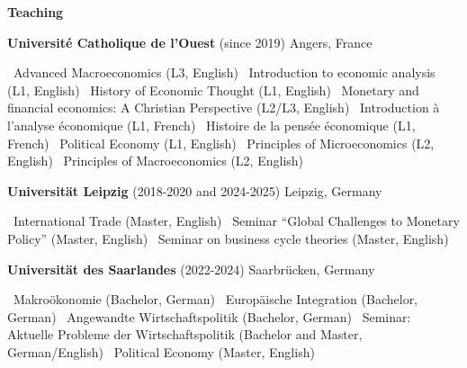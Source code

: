 \documentclass[11pt]{article}
\begin{document}
\vspace{12pt}

\newpage 
\begin{center}
    \textbf{Teaching} \\
\end{center}

\textbf{Université Catholique de l'Ouest} (since 2019) \hfill Angers, France 

\vspace{7pt}

    \textbullet \ Advanced Macroeconomics (L3, English) \textbullet \ Introduction to economic analysis (L1, English)
    \textbullet \ History of Economic Thought (L1, English)
    \textbullet \ Monetary and financial economics: A Christian Perspective (L2/L3, English)
    \textbullet \ Introduction à l'analyse économique (L1, French)
    \textbullet \ Histoire de la pensée économique (L1, French)
    \textbullet \ Political Economy (L1, English)
    \textbullet \ Principles of Microeconomics (L2, English)
    \textbullet \ Principles of Macroeconomics (L2, English)

\vspace{14pt}

\textbf{Universität Leipzig} (2018-2020 and 2024-2025) \hfill Leipzig, Germany 

\vspace{7pt}

    \textbullet \ International Trade (Master, English)
    \textbullet \ Seminar ``Global Challenges to Monetary Policy'' (Master, English) 
    \textbullet \ Seminar on business cycle theories (Master, English)
    
\vspace{14pt}

\textbf{Universität des Saarlandes} (2022-2024) \hfill Saarbrücken, Germany 

\vspace{7pt}

    \textbullet \  Makroökonomie (Bachelor, German)
    \textbullet \  Europäische Integration (Bachelor, German)
    \textbullet \  Angewandte Wirtschaftspolitik (Bachelor, German)
    \textbullet \  Seminar: Aktuelle Probleme der Wirtschaftspolitik (Bachelor and Master, German/English)
    \textbullet \  Political Economy (Master, English)

\vspace{14pt}
\end{document}
